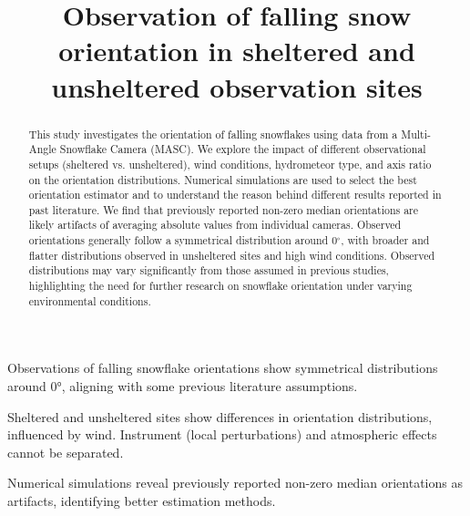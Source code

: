 \documentclass[draft]{agujournal2019}
\begin{document}
\title{Observation of falling snow orientation in sheltered and unsheltered observation sites}








\begin{keypoints}
\item Observations of falling snowflake orientations show symmetrical distributions around 0°, aligning with some previous literature assumptions.
\item Sheltered and unsheltered sites show differences in orientation distributions, influenced by wind. Instrument (local perturbations) and atmospheric effects cannot be separated.
\item Numerical simulations reveal previously reported non-zero median orientations as artifacts, identifying better estimation methods.
\end{keypoints}



\begin{abstract}
This study investigates the orientation of falling snowflakes using data from a Multi-Angle Snowflake Camera (MASC). We explore the impact of different observational setups (sheltered vs. unsheltered), wind conditions, hydrometeor type, and axis ratio on the orientation distributions. Numerical simulations are used to select the best orientation estimator and to understand the reason behind different results reported in past literature. We find that previously reported non-zero median orientations are likely artifacts of averaging absolute values from individual cameras. Observed orientations generally follow a symmetrical distribution around 0$^\circ$, with broader and flatter distributions observed in unsheltered sites and high wind conditions.  Observed distributions may vary significantly from those assumed in previous studies, highlighting the need for further research on snowflake orientation under varying environmental conditions.
\end{abstract}
\end{document}
